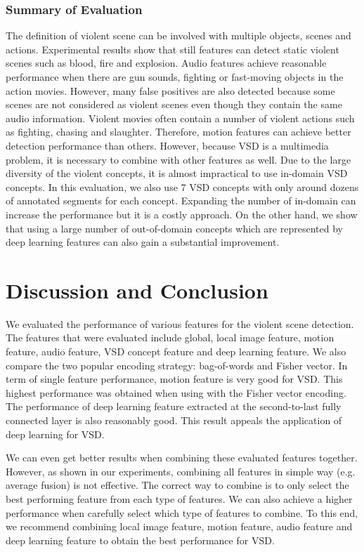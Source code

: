 \documentclass[twocolumn]{bmcart}%
\begin{document}
\subsubsection{Summary of Evaluation}
The definition of violent scene can be involved with multiple objects, scenes and actions.  Experimental results show that still features can detect static violent scenes such as blood, fire and explosion. Audio features achieve reasonable performance when there are gun sounds, fighting or fast-moving objects in the action movies. However, many false positives are also detected because some scenes are not considered as violent scenes even though they contain the same audio information.  
Violent movies often contain a number of violent actions such as fighting, chasing and slaughter.  Therefore, motion features can achieve better detection performance than others. However, because VSD is a multimedia problem, it is necessary to combine with other features as well.
Due to the large diversity of the violent concepts, it is almost impractical to use in-domain VSD concepts.  In this evaluation, we also use 7 VSD concepts with only around dozens of annotated segments for each concept.  Expanding the number of in-domain can increase the performance but it is a costly approach.  On the other hand, we show that using a large number of out-of-domain concepts which are represented by deep learning features can also gain a substantial improvement.

\section{Discussion and Conclusion}
We evaluated the performance of various features for the violent scene detection. The features that were evaluated include global, local image feature, motion feature, audio feature, VSD concept feature and deep learning feature. We also compare the two popular encoding strategy: bag-of-words and Fisher vector. In term of single feature performance, motion feature is very good for VSD. This highest performance was obtained when using with the Fisher vector encoding. The performance of deep learning feature extracted at the second-to-last fully connected layer is also reasonably good. This result appeals the application of deep learning for VSD.   

We can even get better results when combining these evaluated features together. However, as shown in our experiments, combining all features in simple way (e.g. average fusion) is not effective. The correct way to combine is to only select the best performing feature from each type of features. We can also achieve a higher performance when carefully select which type of features to combine. To this end, we recommend combining local image feature, motion feature, audio feature and deep learning feature to obtain the best performance for VSD.
\end{document}
